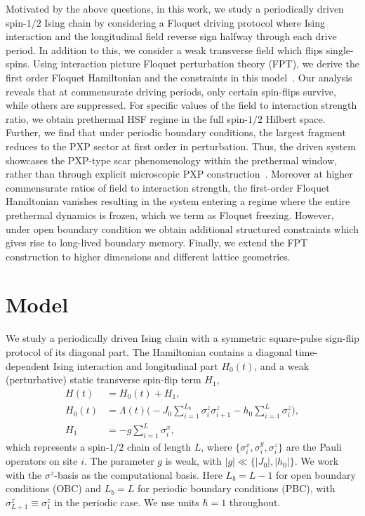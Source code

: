 \documentclass[aps,prb,reprint,twocolumn,amsmath,amssymb,citeautoscript]{revtex4-2}
\begin{document}
Motivated by the above questions, in this work, we study a periodically driven spin-$1/2$ Ising chain by considering a Floquet driving protocol where Ising interaction and the longitudinal field reverse sign halfway through each drive period. In addition to this, we consider a weak transverse field which flips single-spins. Using interaction picture Floquet perturbation theory (FPT), we derive the first order Floquet Hamiltonian and the constraints in this model~\cite{SenSenSengupta2021JPCM,GhoshPaulSengupta2025Spin,ShevchenkoAshhabNori2010PhysRep}. Our analysis reveals that at commensurate driving periods, only certain spin-flips survive, while others are suppressed. For specific values of the field to interaction strength ratio, we obtain prethermal HSF regime in the full spin-$1/2$ Hilbert space. Further, we find that under periodic boundary conditions, the largest fragment reduces to the PXP sector at first order in perturbation. Thus, the driven system  showcases the PXP-type scar phenomenology within the prethermal window, rather than through explicit microscopic PXP construction~\cite{Bernien2017Nature,Turner2018NatPhys,Mukherjee2020PRBFloquetScars,Giudici2024PRL,Ghosh2026arXiv,HudomalDesaulesMukherjeeSuHalimehPapic2022PRB,MizutaTakasanKawakami2020PRResearch,SugiuraKuwaharaSaito2021PRResearch,PaiPretko2019PRL}. Moreover at higher commensurate ratios of field to interaction strength, the first-order Floquet Hamiltonian vanishes resulting in the system entering a regime where the entire prethermal dynamics is frozen, which we term as Floquet freezing. However, under open boundary condition we obtain additional structured constraints which gives rise to long-lived boundary memory. Finally, we extend the FPT construction to higher dimensions and different lattice geometries.

\section{Model}
\label{sec:model}
We study a periodically driven Ising chain with a symmetric square-pulse sign-flip protocol of its diagonal part. The Hamiltonian contains a diagonal time-dependent Ising interaction and longitudinal part $H_0(t)$, and a weak (perturbative) static
transverse spin-flip term $H_1$, 
\begin{equation}
    \begin{aligned}
H(t)&=H_0(t)+H_1,\\ \nonumber
H_0(t)&=\Lambda(t)\bigg(-J_0\sum_{i=1}^{L_b}\sigma_i^z\sigma_{i+1}^z
-h_0\sum_{i=1}^{L}\sigma_i^z\bigg),\\ \nonumber
H_1&=-g\sum_{i=1}^{L}\sigma_i^x,
\label{eq:model_H}
\end{aligned}
\end{equation}
which represents a spin-$1/2$ chain of length $L$, where
$\{\sigma_i^x,\sigma_i^y,\sigma_i^z\}$ are the Pauli operators on site
$i$. The parameter $g$ is weak, with $|g|\ll \{|J_0|,|h_0|\}$. We work with the $\sigma^z$-basis as the computational basis. Here
$L_b=L-1$ for open boundary conditions (OBC) and $L_b=L$ for periodic
boundary conditions (PBC), with $\sigma_{L+1}^z\equiv \sigma_1^z$ in the
periodic case. We use units $\hbar=1$ throughout.
\end{document}
